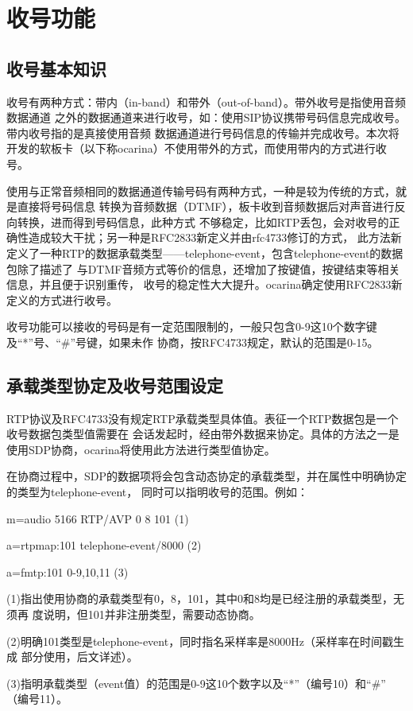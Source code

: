 \documentclass[11pt]{article}
\begin{document}
\section{收号功能}
\subsection{收号基本知识}
    收号有两种方式：带内（in-band）和带外（out-of-band）。带外收号是指使用音频数据通道
之外的数据通道来进行收号，如：使用SIP协议携带号码信息完成收号。带内收号指的是真接使用音频
数据通道进行号码信息的传输并完成收号。本次将开发的软板卡（以下称ocarina）不使用带外的方式，而使用带内的方式进行收号。

    使用与正常音频相同的数据通道传输号码有两种方式，一种是较为传统的方式，就是直接将号码信息
转换为音频数据（DTMF），板卡收到音频数据后对声音进行反向转换，进而得到号码信息，此种方式
不够稳定，比如RTP丢包，会对收号的正确性造成较大干扰；另一种是RFC2833新定义并由rfc4733修订的方式，
此方法新定义了一种RTP的数据承载类型——telephone-event，包含telephone-event的数据包除了描述了
与DTMF音频方式等价的信息，还增加了按键值，按键结束等相关信息，并且便于识别重传，
收号的稳定性大大提升。ocarina确定使用RFC2833新定义的方式进行收号。

    收号功能可以接收的号码是有一定范围限制的，一般只包含0-9这10个数字键及``*''号、``\#''号键，如果未作
协商，按RFC4733规定，默认的范围是0-15。
\subsection{承载类型协定及收号范围设定}
    RTP协议及RFC4733没有规定RTP承载类型具体值。表征一个RTP数据包是一个收号数据包类型值需要在
会话发起时，经由带外数据来协定。具体的方法之一是使用SDP协商，ocarina将使用此方法进行类型值协定。
    
    在协商过程中，SDP的数据项将会包含动态协定的承载类型，并在属性中明确协定的类型为telephone-event，
同时可以指明收号的范围。例如：

    m=audio 5166 RTP/AVP 0 8 101  (1)

    a=rtpmap:101 telephone-event/8000  (2)

    a=fmtp:101 0-9,10,11  (3)
    
    (1)指出使用协商的承载类型有0，8，101，其中0和8均是已经注册的承载类型，无须再
度说明，但101并非注册类型，需要动态协商。

    (2)明确101类型是telephone-event，同时指名采样率是8000Hz（采样率在时间戳生成
部分使用，后文详述）。

    (3)指明承载类型（event值）的范围是0-9这10个数字以及``*''（编号10）和``\#''
（编号11）。
\end{document}
